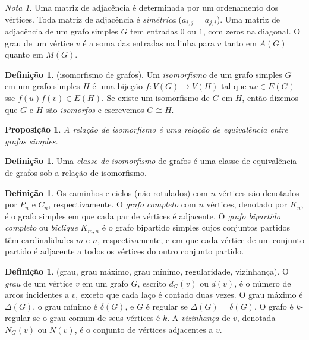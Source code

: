 \documentclass{article}
\theoremstyle{plain}
\newtheorem{prop}[thm]{Proposição}
\theoremstyle{definition}
\newtheorem{defn}[thm]{Definição}
\theoremstyle{remark}
\newtheorem*{rem}{Nota}
\begin{document}
\begin{rem}
    Uma matriz de adjacência é determinada por um ordenamento dos vértices. Toda matriz de adjacência é \emph{simétrica} (\(a_{i,j}=a_{j,i}\)). Uma matriz de adjacência de um grafo simples \(G\) tem entradas \(0\) ou \(1\), com zeros na diagonal. O grau de um vértice \(v\) é a soma das entradas na linha para \(v\) tanto em \(A(G)\) quanto em \(M(G)\).
\end{rem}

\begin{defn} (isomorfismo de grafos).
    Um \emph{isomorfismo} de um grafo simples \(G\) em um grafo simples \(H\) é uma bijeção \(f: V(G) \to V(H)\) tal que \(uv \in E(G)\) sse \(f(u)f(v) \in E(H)\). Se existe um isomorfismo de \(G\) em \(H\), então dizemos que \(G\) e \(H\) são \emph{isomorfos} e escrevemos \(G \cong H\).
\end{defn}

\begin{prop}
    A relação de isomorfismo é uma relação de equivalência entre grafos simples.
\end{prop}

\begin{defn} 
    Uma \emph{classe de isomorfismo} de grafos é uma classe de equivalência de grafos sob a relação de isomorfismo.
\end{defn}

\begin{defn} 
    Os caminhos e ciclos (não rotulados) com \(n\) vértices são denotados por \(P_n\) e \(C_n\), respectivamente. O \emph{grafo completo} com \(n\) vértices, denotado por \(K_n\), é o grafo simples em que cada par de vértices é adjacente. O \emph{grafo bipartido completo} ou \emph{biclique} \(K_{m,n}\) é o grafo bipartido simples cujos conjuntos partidos têm cardinalidades \(m\) e \(n\), respectivamente, e em que cada vértice de um conjunto partido é adjacente a todos os vértices do outro conjunto partido.
\end{defn}

\begin{defn} (grau, grau máximo, grau mínimo, regularidade, vizinhança).
    O \emph{grau} de um vértice \(v\) em um grafo \(G\), escrito \(d_G(v)\) ou \(d(v)\), é o número de arcos incidentes a \(v\), exceto que cada laço é contado duas vezes. O grau máximo é \(\Delta(G)\), o grau mínimo é \(\delta(G)\), e \(G\) é regular se \(\Delta(G) = \delta(G)\).
    O grafo é \(k\)-regular se o grau comum de seus vértices é \(k\). A \emph{vizinhança} de \(v\), denotada \(N_G(v)\) ou \(N(v)\), é o conjunto de vértices adjacentes a \(v\).
\end{defn}
\end{document}
